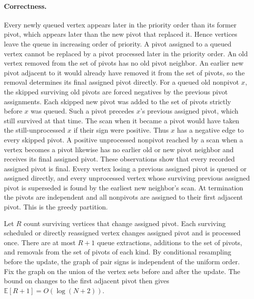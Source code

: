 \documentclass[11pt]{article}
\begin{document}
\paragraph{Correctness.}
Every newly queued vertex appears later in the priority order than its former pivot,
which appears later than the new pivot that replaced it. Hence vertices leave the queue
in increasing order of priority.
A pivot assigned to a queued vertex cannot be replaced by a pivot
processed later in the priority order. An old vertex removed from the set of pivots has no old pivot
neighbor. An earlier new pivot adjacent to it would already have
removed it from the set of pivots, so the removal determines its final assigned pivot directly.
For a queued old nonpivot $x$, the skipped surviving old pivots are
forced negatives by the previous pivot assignments. Each skipped new pivot was
added to the set of pivots strictly before $x$ was queued. Such a pivot precedes $x$'s
previous assigned pivot, which still survived at that time. The scan when it became a pivot would have
taken the still-unprocessed $x$ if their sign were positive. Thus $x$ has a negative
edge to every skipped pivot. A positive unprocessed nonpivot reached by a
scan when a vertex becomes a pivot likewise has no earlier old or new pivot neighbor
and receives its final assigned pivot. These observations show that every
recorded assigned pivot is final. Every vertex losing a previous assigned pivot is queued
or assigned directly, and every unprocessed vertex whose surviving previous assigned pivot
is superseded is found by the earliest new neighbor's scan. At
termination the pivots are independent and all nonpivots are assigned to
their first adjacent pivot. This is the greedy partition.

Let $R$ count surviving vertices that change assigned pivot. Each surviving
scheduled or directly reassigned vertex changes assigned pivot and is processed
once. There are at most $R+1$ queue extractions, additions to the set of pivots, and
removals from the set of pivots of each kind. By conditional resampling before the update,
the graph of pair signs is independent of the uniform order. Fix the
graph on the union of the vertex sets before and after the update.
The bound on changes to the first adjacent pivot then gives
$\mathbb E[R+1]=O(\log(N+2))$.
\end{document}
